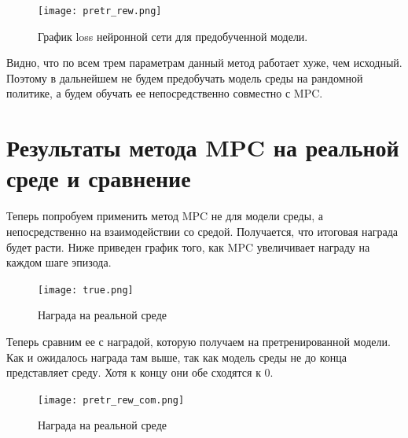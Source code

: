 \begin{figure}[!h]
	\caption {График loss нейронной сети для предобученной модели. }
	\centering
	\texttt{[image: pretr\_rew.png]}
	\label{fig:agent}
\end{figure}

Видно, что по всем трем параметрам данный метод работает хуже, чем исходный. Поэтому в дальнейшем не будем предобучать модель среды на рандомной политике, а будем обучать ее непосредственно совместно с MPC.


\section{Результаты метода MPC на реальной среде и сравнение}\label{1sec:optimal-control}

Теперь попробуем применить метод MPC не для модели среды, а непосредственно на взаимодействии со средой. Получается, что итоговая награда будет расти. Ниже приведен график того, как MPC увеличивает награду на каждом шаге эпизода. 


\begin{figure}[!h]
	\caption {Награда на реальной среде}
	\centering
	\texttt{[image: true.png]}
	\label{fig:agent}
\end{figure}

Теперь сравним ее с наградой, которую получаем на претренированной модели. Как и ожидалось награда там выше, так как модель среды не до конца представляет среду. Хотя к концу они обе сходятся к 0. \newpage

\begin{figure}[!h]
	\caption {Награда на реальной среде}
	\centering
	\texttt{[image: pretr\_rew\_com.png]}
	\label{fig:agent}
\end{figure}

